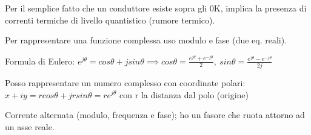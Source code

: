 Per il semplice fatto che un conduttore esiste sopra gli 0K, implica la presenza di correnti termiche di livello quantistico (rumore termico).

Per rappresentare una funzione complessa uso modulo e fase (due eq. reali).

Formula di Eulero:
$e^{j\theta} = cos \theta + jsin\theta \implies cos\theta = \frac{e^{j\theta} + e^{-j\theta}}{2},\ sin\theta = \frac{e^{j\theta} - e^{-j\theta}}{2j}$

Posso rappresentare un numero complesso con coordinate polari: $x + iy = r cos \theta + jrsin \theta = re^{j\theta }$
con r la distanza dal polo (origine) 

Corrente alternata (modulo, frequenza e fase); ho un fasore che ruota attorno ad un asse reale.


